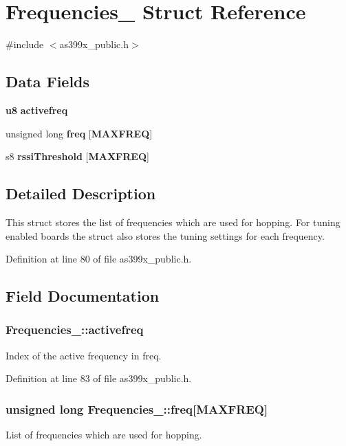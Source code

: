 \section{Frequencies\-\_\- Struct Reference}
\label{struct_frequencies__}


{\ttfamily \#include $<$as399x\-\_\-public.\-h$>$}

\subsection*{Data Fields}
\begin{DoxyCompactItemize}
\item 
{\bf u8} {\bf activefreq}
\item 
unsigned long {\bf freq} [{\bf M\-A\-X\-F\-R\-E\-Q}]
\item 
s8 {\bf rssi\-Threshold} [{\bf M\-A\-X\-F\-R\-E\-Q}]
\end{DoxyCompactItemize}


\subsection{Detailed Description}
This struct stores the list of frequencies which are used for hopping. For tuning enabled boards the struct also stores the tuning settings for each frequency. 

Definition at line 80 of file as399x\-\_\-public.\-h.



\subsection{Field Documentation}
\subsubsection[{activefreq}]{ Frequencies\-\_\-\-::activefreq}\label{struct_frequencies___abd6960d8e7b16bae002c632f4108572d}
Index of the active frequency in freq. 

Definition at line 83 of file as399x\-\_\-public.\-h.

\subsubsection[{freq}]{\setlength{\rightskip}{0pt plus 5cm}unsigned long Frequencies\-\_\-\-::freq[{\bf M\-A\-X\-F\-R\-E\-Q}]}\label{struct_frequencies___a1ce7a109d5338bc3be1ba6e515cf37f9}
List of frequencies which are used for hopping. 

